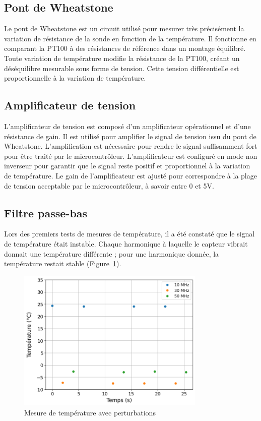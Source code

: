 
\subsection{Pont de Wheatstone}
Le pont de Wheatstone est un circuit utilisé pour mesurer très précisément la variation de résistance de la sonde en fonction de la température. 
Il fonctionne en comparant la PT100 à des résistances de référence dans un montage équilibré. Toute variation de température modifie la résistance de la PT100, 
créant un déséquilibre mesurable sous forme de tension. Cette tension différentielle est proportionnelle à la variation de température.

\subsection{Amplificateur de tension}
L'amplificateur de tension est composé d'un amplificateur opérationnel et d'une résistance de gain. 
Il est utilisé pour amplifier le signal de tension issu du pont de Wheatstone.
L'amplification est nécessaire pour rendre le signal suffisamment fort pour être traité par le microcontrôleur.
L'amplificateur est configuré en mode non inverseur pour garantir que le signal reste positif et proportionnel à la variation de température.
Le gain de l'amplificateur est ajusté pour correspondre à la plage de tension acceptable par le microcontrôleur, à savoir entre 0 et 5V.

\subsection{Filtre passe-bas}
Lors des premiers tests de mesures de température, il a été constaté que le signal de température était instable.
Chaque harmonique à laquelle le capteur vibrait donnait une température différente ; pour une harmonique donnée, la température restait stable (Figure~\ref{fig:TempBruit}).
\begin{figure}[H]
    \centering
    \includegraphics[width=0.8\textwidth]{assets/figures/TempBruit.png}
    \caption{Mesure de température avec perturbations}
    \label{fig:TempBruit}
\end{figure}

